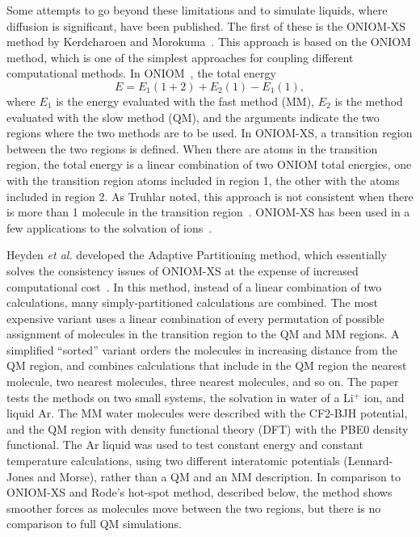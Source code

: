 \documentclass[11pt]{revtex4}
\begin{document}
Some attempts to go beyond these limitations and to simulate liquids,
where diffusion is significant, have been published.  The first of
these is the ONIOM-XS method by Kerdcharoen and
Morokuma~\cite{kerdcharoen_chem_phys_lett_2002a}.  This approach is
based on the ONIOM method, which is one of the simplest approaches
for coupling different computational methods.  In ONIOM~\cite{svensson_j_phys_chem_1996a},
the total energy
$$ E = E_1(1+2) + E_2(1) - E_1(1), $$
where $E_1$ is the energy evaluated with the fast method (MM), $E_2$ is
the method evaluated with the slow method (QM), and the arguments
indicate the two regions where the two methods are to be used.  In
ONIOM-XS, a transition region between the two regions is defined.
When there are atoms in the transition region, the total energy is
a linear combination of two ONIOM total energies, one with the
transition region atoms included in region 1, the other with the
atoms included in region 2.  As Truhlar noted, this approach is not
consistent when there is more than 1 molecule in the transition
region~\cite{heyden_j_phys_chem_b_2007a}.  ONIOM-XS has been used
in a few applications to the solvation of
ions~\cite{kerdcharoen_j_chem_phys_2003a,hofer_j_amer_chem_soc_2005a}.

Heyden {\it et al.} developed the Adaptive Partitioning method,
which essentially solves the consistency issues of ONIOM-XS at the
expense of increased computational cost~\cite{heyden_j_phys_chem_b_2007a}.
In this method, instead of a linear combination of two calculations,
many simply-partitioned calculations are combined.  The most expensive
variant uses a linear combination of every permutation of possible
assignment of molecules in the transition region to the QM and MM
regions.  A simplified ``sorted'' variant orders the molecules in
increasing distance from the QM region, and combines calculations
that include in the QM region the nearest molecule, two nearest
molecules, three nearest molecules, and so on.  The paper tests the
methods on two small systems, the solvation in water of a Li$^+$
ion, and liquid Ar.  The MM water molecules were described with the
CF2-BJH potential, and the QM region with density functional theory
(DFT) with the PBE0 density functional.  The Ar liquid was used to
test constant energy and constant temperature calculations, using
two different interatomic potentials (Lennard-Jones and Morse),
rather than a QM and an MM description.  In comparison to ONIOM-XS
and Rode's hot-spot method, described below, the method shows
smoother forces as molecules move between the two regions, but there
is no comparison to full QM simulations.
\end{document}
